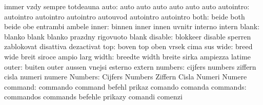                            immer                     vzdy
                           sempre                    totdeauna
                     auto: auto                      auto
                           auto                      auto
                           auto                      auto
                autointro: autointro                 autointro
                           autointro                 autouvod
                           autointro                 autointro
                     both: beide                     both
                           beide                     obe
                           entrambi                  ambele
                    inner: binnen                    inner
                           innen                     uvnitr
                           interno                   intern
                    blank: blanko                    blank
                           blanko                    prazdny
                           rigovuoto                 blank
                  disable: blokkeer                  disable
                           sperren                   zablokovat
                           disattiva                 dezactivat
                      top: boven                     top
                           oben                      vrsek
                           cima                      sus
                     wide: breed                     wide
                           breit                     siroce
                           ampio                     larg
                    width: breedte                   width
                           breite                    sirka
                           ampiezza                  latime
                    outer: buiten                    outer
                           aussen                    vnejsi
                           esterno                   extern
                  numbers: cijfers                   numbers
                           ziffern                   cisla
                           numeri                    numere
                  Numbers: Cijfers                   Numbers
                           Ziffern                   Cisla
                           Numeri                    Numere
                  command: commando                  command
                           befehl                    prikaz
                           comando                   comanda
                 commands: commandos                 commands
                           befehle                   prikazy
                           comandi                   comenzi
